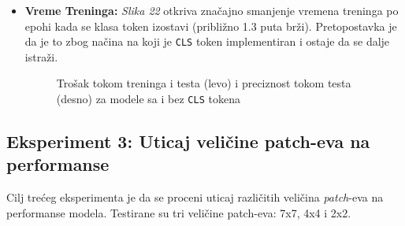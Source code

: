 \documentclass[12pt]{article}
\begin{document}
\begin{itemize}
      \newpage
      \item \textbf{Vreme Treninga:} \textit{Slika 22} otkriva 
      značajno smanjenje vremena treninga po epohi kada se klasa token izostavi 
      (približno 1.3 puta brži). Pretopostavka je da je to zbog načina 
      na koji je \texttt{CLS} token implementiran i ostaje  
      da se dalje istraži.
      \begin{figure}[h!]
         \centering
         \caption{Trošak tokom treninga i testa (levo) i preciznost tokom testa (desno) za modele sa i bez \texttt{CLS} tokena}
         \label{fig:exp2_time}
      \end{figure}
   \end{itemize}

   \newpage
   \subsection{Eksperiment 3: Uticaj veličine patch-eva na performanse}
   Cilj trećeg eksperimenta je da se proceni uticaj različitih veličina 
   \textit{patch}-eva na performanse modela. Testirane su tri veličine 
   patch-eva: 7x7, 4x4 i 2x2.
\end{document}
